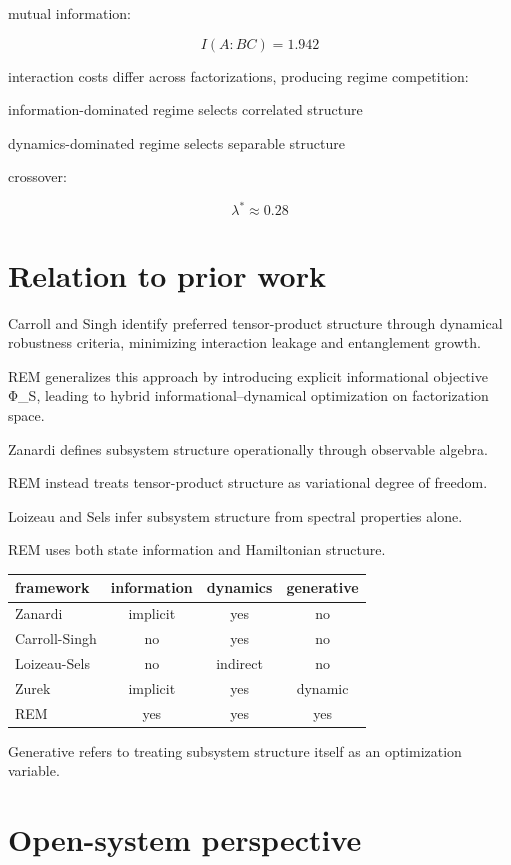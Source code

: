 \documentclass[11pt]{article}
\begin{document}
mutual information:

\[
I(A:BC)=1.942
\]

interaction costs differ across factorizations,
producing regime competition:

information-dominated regime selects correlated structure

dynamics-dominated regime selects separable structure

crossover:

\[
\lambda^*\approx0.28
\]

\section{Relation to prior work}

Carroll and Singh identify preferred tensor-product structure
through dynamical robustness criteria,
minimizing interaction leakage and entanglement growth.

REM generalizes this approach by introducing explicit informational objective Φ_S,
leading to hybrid informational–dynamical optimization on factorization space.

Zanardi defines subsystem structure operationally through observable algebra.

REM instead treats tensor-product structure as variational degree of freedom.

Loizeau and Sels infer subsystem structure from spectral properties alone.

REM uses both state information and Hamiltonian structure.

\begin{center}
\begin{tabular}{lccc}
\toprule
framework & information & dynamics & generative \\
\midrule
Zanardi & implicit & yes & no \\
Carroll-Singh & no & yes & no \\
Loizeau-Sels & no & indirect & no \\
Zurek & implicit & yes & dynamic \\
REM & yes & yes & yes \\
\bottomrule
\end{tabular}
\end{center}

Generative refers to treating subsystem structure itself
as an optimization variable.

\section{Open-system perspective}
\end{document}
